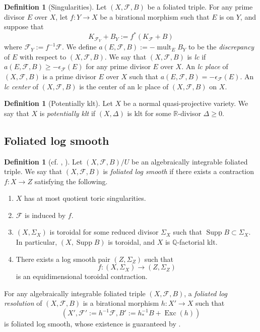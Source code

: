\documentclass[11pt]{amsart}
\numberwithin{equation}{section}
\newcommand{\Qq}{\mathbb{Q}}
\newcommand{\Rr}{\mathbb{R}}
\newcommand{\Exc}{\operatorname{Exc}}
\newcommand{\Supp}{\operatorname{Supp}}
\newcommand{\mult}{\operatorname{mult}}
\newcommand{\Ff}{\mathcal{F}}
\theoremstyle{definition}
\newtheorem{defn}[thm]{Definition}
\theoremstyle{definition}
\theoremstyle{definition}
\begin{document}
\begin{defn}[Singularities]\label{defn: foliation singularity}
Let $(X,\Ff,B)$ be a foliated triple. For any prime divisor $E$ over $X$, let $f: Y\rightarrow X$ be a birational morphism such that $E$ is on $Y$, and suppose that
$$K_{\Ff_Y}+B_Y:=f^*(K_\Ff+B)$$
where $\Ff_Y:=f^{-1}\Ff$. We define $a(E,\Ff,B):=-\mult_EB_Y$ to be the \emph{discrepancy} of $E$ with respect to $(X,\Ff,B)$. We say that $(X,\Ff,B)$ is \emph{lc} if $a(E,\Ff,B)\geq -\epsilon_{\Ff}(E)$ for any prime divisor $E$ over $X$. An \emph{lc place} of $(X,\Ff,B)$ is a prime divisor $E$ over $X$ such that $a(E,\Ff,B)=-\epsilon_{\Ff}(E)$. An \emph{lc center} of $(X,\Ff,B)$ is the center of an lc place of $(X,\Ff,B)$ on $X$.
\end{defn}

\begin{defn}[Potentially klt]\label{defn: potentially klt}
Let $X$ be a normal quasi-projective variety. We say that $X$ is \emph{potentially klt} if $(X,\Delta)$ is klt for some $\Rr$-divisor $\Delta\geq 0$. 
\end{defn}

\subsection{Foliated log smooth}

\begin{defn}[{cf. \cite[3.2 Log canonical foliated pairs]{ACSS21}, \cite[Definition 6.2.1]{CHLX23}}]\label{defn: foliated log smooth}
Let $(X,\Ff,B)/U$ be an algebraically integrable foliated triple. We say that $(X,\Ff,B)$ is \emph{foliated log smooth} if there exists a contraction $f: X\rightarrow Z$ satisfying the following.
\begin{enumerate}
  \item $X$ has at most quotient toric singularities.
  \item $\Ff$ is induced by $f$.
  \item $(X,\Sigma_X)$ is toroidal for some reduced divisor $\Sigma_X$ such that $\Supp B\subset\Sigma_X$.  In particular, $(X,\Supp B)$ is toroidal, and $X$ is $\Qq$-factorial klt.
  \item There exists a log smooth pair $(Z,\Sigma_Z)$ such that $$f: (X,\Sigma_X)\rightarrow (Z,\Sigma_Z)$$ is an equidimensional toroidal contraction.
\end{enumerate}

For any algebraically integrable foliated triple $(X,\Ff,B)$, a \emph{foliated log resolution} of $(X,\Ff,B)$ is a birational morphism $h: X'\rightarrow X$ such that 
$$(X',\Ff':=h^{-1}\Ff,B':=h^{-1}_\ast B+\Exc(h))$$ 
is foliated log smooth, whose existence is guaranteed by \cite{AK00,ACSS21,CHLX23}.
\end{defn}
\end{document}
